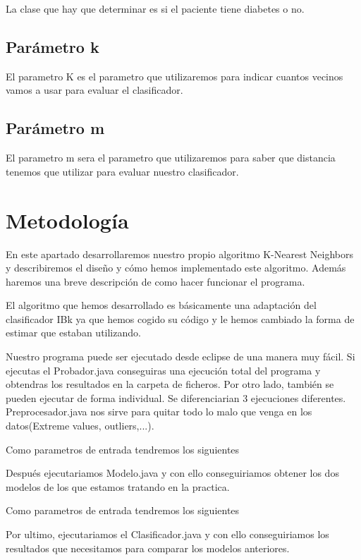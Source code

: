 \documentclass[a4paper,10pt]{article}
\theoremstyle{plain}
\begin{document}
La clase que hay que determinar es si el paciente tiene diabetes o no.

\subsection{Par\'ametro {\color{blue}k}}

El parametro K es el parametro que utilizaremos para indicar cuantos vecinos vamos a usar para evaluar el clasificador.

\subsection{Par\'ametro {\color{magenta}m}}

El parametro m sera el parametro que utilizaremos para saber que distancia tenemos que utilizar para evaluar nuestro clasificador.
    
\section{Metodolog\'ia}

En este apartado desarrollaremos nuestro propio algoritmo K-Nearest Neighbors y describiremos el dise\~no y c\'omo hemos implementado este algoritmo. Adem\'as haremos una breve descripci\'on de como hacer funcionar el programa.

El algoritmo que hemos desarrollado es b\'asicamente una adaptaci\'on del clasificador IBk ya que hemos cogido su c\'odigo y le hemos cambiado la forma de estimar que estaban utilizando. 


Nuestro programa puede ser ejecutado desde eclipse de una manera muy f\'acil. Si ejecutas el Probador.java conseguiras una ejecuci\'on total del programa y obtendras los resultados en la carpeta de ficheros. Por otro lado, tambi\'en se pueden ejecutar de forma individual. Se diferenciarian 3 ejecuciones diferentes. Preprocesador.java nos sirve para quitar todo lo malo que venga en los datos(Extreme values, outliers,...).

	Como parametros de entrada tendremos los siguientes

Despu\'es ejecutariamos Modelo.java y con ello conseguiriamos obtener los dos modelos de los que estamos tratando en la practica. 

	Como parametros de entrada tendremos los siguientes


Por ultimo, ejecutariamos el Clasificador.java y con ello conseguiriamos los resultados que necesitamos para comparar los modelos anteriores. 
\end{document}
